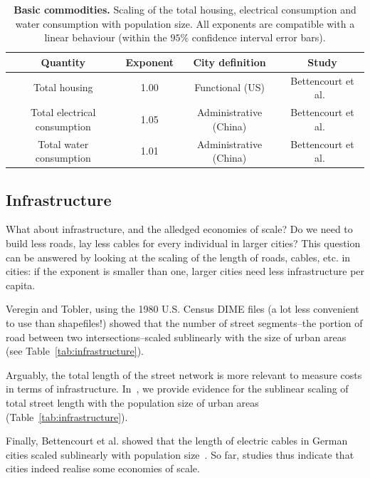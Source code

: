 \begin{table}[!h]
    \centering
\begin{tabular}{|cccc|}
\hline
Quantity & Exponent & City definition & Study\\
\hline
Total housing & 1.00 & Functional (US) & Bettencourt et al.~\cite{Bettencourt:2007}\\
Total electrical consumption & 1.05 & Administrative (China) & Bettencourt et al.~\cite{Bettencourt:2007}\\
Total water consumption & 1.01 & Administrative (China) & Bettencourt et al.~\cite{Bettencourt:2007}\\
\hline
\end{tabular}
\caption{{\bf Basic commodities. } Scaling of the total housing, electrical
    consumption and water consumption with population size. All exponents are
    compatible with a linear behaviour (within the $95\%$ confidence interval
    error bars).\label{tab:commodities}
}
\end{table}



\subsection{Infrastructure}
\label{sub:infrastructure}

What about infrastructure, and the alledged economies of scale? Do we need to build less
roads, lay less cables for every individual in larger cities? This question can
be answered by looking at the scaling of the length of roads, cables, etc. in
cities: if the exponent is smaller than one, larger cities need less
infrastructure per capita.

Veregin and Tobler, using the 1980 U.S. Census DIME files (a lot less convenient
to use than shapefiles!) showed that the number of street segments--the portion
of road between two intersections--scaled sublinearly with the size of urban
areas~\cite{Veregin:1997} (see Table~\ref{tab:infrastructure}). 

Arguably, the total length of the street network is more relevant to measure
costs in terms of infrastructure. In~\cite{Louf:2014_scaling}, we provide
evidence for the sublinear scaling of total street length with the population
size of urban areas (Table~\ref{tab:infrastructure}). 

Finally, Bettencourt et al. showed that the length of electric cables in German
cities scaled sublinearly with population size~\cite{Bettencourt:2007}. So far,
studies thus indicate that cities indeed realise some economies of scale.

